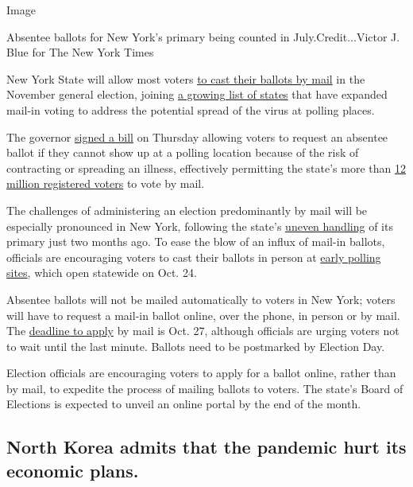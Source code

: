Image

Absentee ballots for New York's primary being counted in
July.Credit...Victor J. Blue for The New York Times

New York State will allow most voters
\href{https://www.nytimes3xbfgragh.onion/2020/08/20/nyregion/vote-by-mail-new-york.html}{to
cast their ballots by mail} in the November general election, joining
\href{https://www.nytimes3xbfgragh.onion/interactive/2020/08/11/us/politics/vote-by-mail-us-states.html}{a
growing list of states} that have expanded mail-in voting to address the
potential spread of the virus at polling places.

The governor
\href{https://www.nysenate.gov/legislation/bills/2019/s8015}{signed a
bill} on Thursday allowing voters to request an absentee ballot if they
cannot show up at a polling location because of the risk of contracting
or spreading an illness, effectively permitting the state's more than
\href{https://www.elections.ny.gov/NYSBOE/enrollment/county/county_feb19.pdf}{12
million registered voters} to vote by mail.

The challenges of administering an election predominantly by mail will
be especially pronounced in New York, following the state's
\href{https://www.nytimes3xbfgragh.onion/2020/07/17/nyregion/election-absentee-ballots-primary.html}{uneven
handling} of its primary just two months ago. To ease the blow of an
influx of mail-in ballots, officials are encouraging voters to cast
their ballots in person at
\href{https://newyork.cbslocal.com/2020/08/19/nyc-early-voting/}{early
polling sites}, which open statewide on Oct. 24.

Absentee ballots will not be mailed automatically to voters in New York;
voters will have to request a mail-in ballot online, over the phone, in
person or by mail. The
\href{https://www.elections.ny.gov/votingdeadlines.html}{deadline to
apply} by mail is Oct. 27, although officials are urging voters not to
wait until the last minute. Ballots need to be postmarked by Election
Day.

Election officials are encouraging voters to apply for a ballot online,
rather than by mail, to expedite the process of mailing ballots to
voters. The state's Board of Elections is expected to unveil an online
portal by the end of the month.

\hypertarget{north-korea-admits-that-the-pandemic-hurt-its-economic-plans}{%
\subsection{North Korea admits that the pandemic hurt its economic
plans.}\label{north-korea-admits-that-the-pandemic-hurt-its-economic-plans}}

